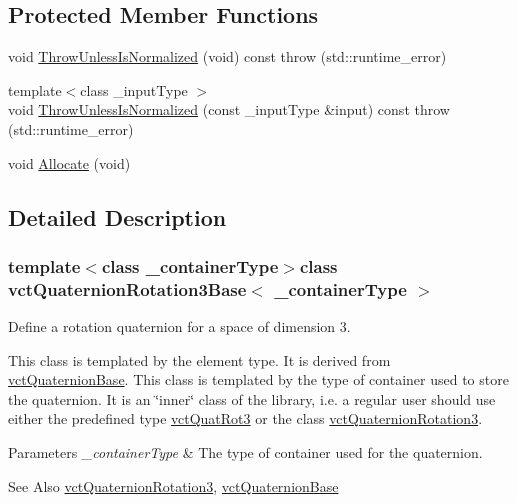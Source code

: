 \subsection*{Protected Member Functions}
\begin{DoxyCompactItemize}
\item 
void \hyperlink{classvct_quaternion_rotation3_base_a1e995a36965cc79f5832b090023f3c20}{Throw\-Unless\-Is\-Normalized} (void) const   throw (std\-::runtime\-\_\-error)
\item 
{\footnotesize template$<$class \-\_\-input\-Type $>$ }\\void \hyperlink{classvct_quaternion_rotation3_base_a6a2860093d561d93d4afed3b1e191259}{Throw\-Unless\-Is\-Normalized} (const \-\_\-input\-Type \&input) const   throw (std\-::runtime\-\_\-error)
\item 
void \hyperlink{classvct_quaternion_rotation3_base_a4dec998672be04b84b933b608fa65df2}{Allocate} (void)
\end{DoxyCompactItemize}


\subsection{Detailed Description}
\subsubsection*{template$<$class \-\_\-container\-Type$>$class vct\-Quaternion\-Rotation3\-Base$<$ \-\_\-container\-Type $>$}

Define a rotation quaternion for a space of dimension 3. 

This class is templated by the element type. It is derived from \hyperlink{classvct_quaternion_base}{vct\-Quaternion\-Base}. This class is templated by the type of container used to store the quaternion. It is an \char`\"{}inner\char`\"{} class of the library, i.\-e. a regular user should use either the predefined type \hyperlink{vct_transformation_types_8h_a595c3c83888ed4fb8ae707126efd25e3}{vct\-Quat\-Rot3} or the class \hyperlink{classvct_quaternion_rotation3}{vct\-Quaternion\-Rotation3}.


\begin{DoxyParams}{Parameters}
{\em \-\_\-container\-Type} & The type of container used for the quaternion.\\
\hline
\end{DoxyParams}
\begin{DoxySeeAlso}{See Also}
\hyperlink{classvct_quaternion_rotation3}{vct\-Quaternion\-Rotation3}, \hyperlink{classvct_quaternion_base}{vct\-Quaternion\-Base} 
\end{DoxySeeAlso}


